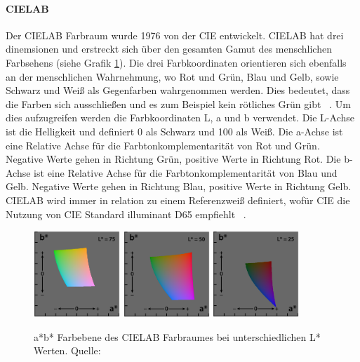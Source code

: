 \documentclass[12pt, a4paper, ngerman]{article}
\begin{document}
\paragraph{CIELAB}
Der CIELAB Farbraum wurde 1976 von der CIE entwickelt.
CIELAB hat drei dinemsionen und erstreckt sich über den gesamten Gamut des menschlichen Farbsehens (siehe Grafik \ref{fig:CIELAB}).
Die drei Farbkoordinaten orientieren sich ebenfalls an der menschlichen Wahrnehmung, 
wo Rot und Grün, Blau und Gelb, sowie Schwarz und Weiß als Gegenfarben wahrgenommen werden.
Dies bedeutet, dass die Farben sich ausschließen und es zum Beispiel kein rötliches Grün gibt ~\cite{Becker-Carus_Wendt_2017}.
Um dies aufzugreifen werden die Farbkoordinaten L, a und b verwendet.
Die L-Achse ist die Helligkeit und definiert 0 als Schwarz und 100 als Weiß.
Die a-Achse ist eine Relative Achse für die Farbtonkomplementarität von Rot und Grün.
Negative Werte gehen in Richtung Grün, positive Werte in Richtung Rot.
Die b-Achse ist eine Relative Achse für die Farbtonkomplementarität von Blau und Gelb.
Negative Werte gehen in Richtung Blau, positive Werte in Richtung Gelb.
CIELAB wird immer in relation zu einem Referenzweiß definiert, 
wofür CIE die Nutzung von CIE Standard illuminant D65 empfiehlt ~\cite{CIELAB_color_space_2023}.

\begin{figure}
  \centering
  \includegraphics[width=0.29\textwidth]{Grafiken/CIELAB1.png}
  \includegraphics[width=0.29\textwidth]{Grafiken/CIELAB2.png}
  \includegraphics[width=0.29\textwidth]{Grafiken/CIELAB3.png}
  \caption{a*b* Farbebene des CIELAB Farbraumes bei unterschiedlichen L* Werten. Quelle: ~\cite{CIELAB_color_space_2023}}
  \label{fig:CIELAB}
\end{figure}
\end{document}
